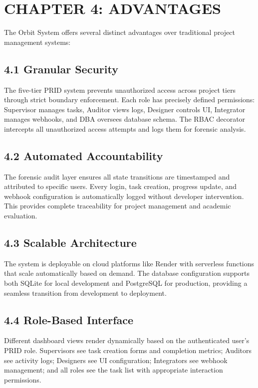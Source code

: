 ﻿\documentclass[12pt]{article}
\def\normaltext{\fontsize{12pt}{18pt}\color{secondary}}
\begin{document}
\section*{{\color{primary}CHAPTER 4: ADVANTAGES}}
\normaltext
The Orbit System offers several distinct advantages over traditional project management systems:

\subsection*{4.1 Granular Security}
The five-tier PRID system prevents unauthorized access across project tiers through strict boundary enforcement. Each role has precisely defined permissions: Supervisor manages tasks, Auditor views logs, Designer controls UI, Integrator manages webhooks, and DBA oversees database schema. The RBAC decorator intercepts all unauthorized access attempts and logs them for forensic analysis.

\subsection*{4.2 Automated Accountability}
The forensic audit layer ensures all state transitions are timestamped and attributed to specific users. Every login, task creation, progress update, and webhook configuration is automatically logged without developer intervention. This provides complete traceability for project management and academic evaluation.

\subsection*{4.3 Scalable Architecture}
The system is deployable on cloud platforms like Render with serverless functions that scale automatically based on demand. The database configuration supports both SQLite for local development and PostgreSQL for production, providing a seamless transition from development to deployment.

\subsection*{4.4 Role-Based Interface}
Different dashboard views render dynamically based on the authenticated user's PRID role. Supervisors see task creation forms and completion metrics; Auditors see activity logs; Designers see UI configuration; Integrators see webhook management; and all roles see the task list with appropriate interaction permissions.
\end{document}
